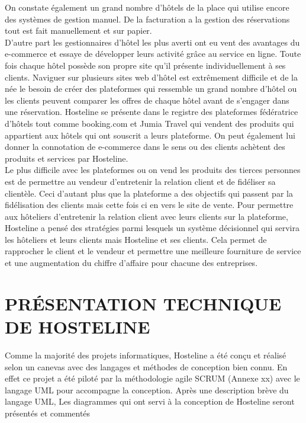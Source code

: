 On constate également un grand nombre d’hôtels de la place qui utilise encore des systèmes de gestion manuel. De la facturation a la gestion des réservations tout est fait manuellement et sur papier.\\

D’autre part les gestionnaires d’hôtel les plus averti ont eu vent des avantages du e-commerce et essaye de développer leurs activité grâce au service en ligne. Toute fois chaque hôtel possède son propre site qu’il présente individuellement à ses clients. Naviguer sur plusieurs sites web d’hôtel est extrêmement difficile et de la née le besoin de créer des plateformes qui ressemble un grand nombre d’hôtel ou les clients peuvent comparer les offres de chaque hôtel avant de s’engager dans une réservation. Hosteline se présente dans le registre des plateformes fédératrice d’hôtels tout comme booking.com et Jumia Travel qui vendent des produits qui appartient aux hôtels qui ont souscrit a leurs plateforme. On peut également lui donner la connotation de e-commerce dans le sens ou des clients achètent des produits et services par Hosteline.\\

Le plus difficile avec les plateformes ou on vend les produits des tierces personnes est de permettre au vendeur d’entretenir la relation client et de fidéliser sa clientèle. Ceci d’autant plus que la plateforme a des objectifs qui passent par la fidélisation des clients mais cette fois ci en vers le site de vente. Pour permettre aux hôteliers d’entretenir la relation client avec leurs clients sur la plateforme, Hosteline a pensé des stratégies parmi lesquels un système décisionnel qui servira les hôteliers et leurs clients mais Hosteline et ses clients. Cela permet de rapprocher le client et le vendeur et permettre une meilleure fourniture de service et une augmentation du chiffre d'affaire pour chacune des entreprises.\\


\section{PRÉSENTATION TECHNIQUE  DE HOSTELINE}
 Comme la majorité des projets informatiques, Hosteline a été conçu et réalisé selon un canevas avec des langages et méthodes de conception bien connu. En effet ce projet a été piloté par la méthodologie agile SCRUM (Annexe xx) avec le langage UML pour accompagne la conception. Après une description brève du langage UML, Les diagrammes qui ont servi à la conception de Hosteline seront présentés et commentés
 
